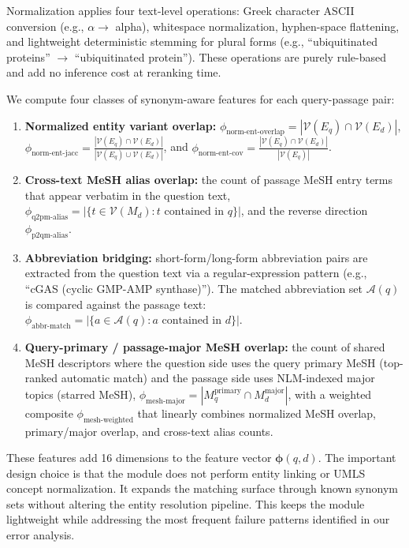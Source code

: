 Normalization applies four text-level operations: Greek character ASCII conversion (e.g., $\alpha \rightarrow$ alpha), whitespace normalization, hyphen-space flattening, and lightweight deterministic stemming for plural forms (e.g., ``ubiquitinated proteins'' $\rightarrow$ ``ubiquitinated protein''). These operations are purely rule-based and add no inference cost at reranking time.

We compute four classes of synonym-aware features for each query-passage pair:

\begin{enumerate}[leftmargin=*,nosep]
    \item \textbf{Normalized entity variant overlap:} $\phi_{\text{norm-ent-overlap}} = |\mathcal{V}(E_q) \cap \mathcal{V}(E_d)|$, $\phi_{\text{norm-ent-jacc}} = \frac{|\mathcal{V}(E_q) \cap \mathcal{V}(E_d)|}{|\mathcal{V}(E_q) \cup \mathcal{V}(E_d)|}$, and $\phi_{\text{norm-ent-cov}} = \frac{|\mathcal{V}(E_q) \cap \mathcal{V}(E_d)|}{|\mathcal{V}(E_q)|}$.
    \item \textbf{Cross-text MeSH alias overlap:} the count of passage MeSH entry terms that appear verbatim in the question text, $\phi_{\text{q2pm-alias}} = |\{t \in \mathcal{V}(M_d) : t \text{ contained in } q\}|$, and the reverse direction $\phi_{\text{p2qm-alias}}$.
    \item \textbf{Abbreviation bridging:} short-form/long-form abbreviation pairs are extracted from the question text via a regular-expression pattern (e.g., ``cGAS (cyclic GMP-AMP synthase)''). The matched abbreviation set $\mathcal{A}(q)$ is compared against the passage text: $\phi_{\text{abbr-match}} = |\{a \in \mathcal{A}(q) : a \text{ contained in } d\}|$.
    \item \textbf{Query-primary / passage-major MeSH overlap:} the count of shared MeSH descriptors where the question side uses the query primary MeSH (top-ranked automatic match) and the passage side uses NLM-indexed major topics (starred MeSH), $\phi_{\text{mesh-major}} = |M_q^{\text{primary}} \cap M_d^{\text{major}}|$, with a weighted composite $\phi_{\text{mesh-weighted}}$ that linearly combines normalized MeSH overlap, primary/major overlap, and cross-text alias counts.
\end{enumerate}

These features add 16 dimensions to the feature vector $\boldsymbol{\phi}(q,d)$. The important design choice is that the module does not perform entity linking or UMLS concept normalization. It expands the matching surface through known synonym sets without altering the entity resolution pipeline. This keeps the module lightweight while addressing the most frequent failure patterns identified in our error analysis.

